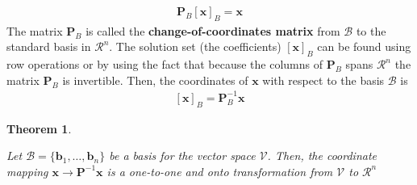 \documentclass[
]{book}
\newtheorem{theorem}{Theorem}[chapter]
\theoremstyle{definition}
\theoremstyle{definition}
\theoremstyle{definition}
\theoremstyle{remark}
\begin{document}
\[
\begin{aligned}
\mathbf{P}_B [\mathbf{x}]_B = \mathbf{x}
\end{aligned}
\]
The matrix \(\mathbf{P}_B\) is called the \textbf{change-of-coordinates matrix} from \(\mathcal{B}\) to the standard basis in \(\mathcal{R}^n\). The solution set (the coefficients) \([\mathbf{x}]_B\) can be found using row operations or by using the fact that because the columns of \(\mathbf{P}_B\) spans \(\mathcal{R}^n\) the matrix \(\mathbf{P}_B\) is invertible. Then, the coordinates of \(\mathbf{x}\) with respect to the basis \(\mathcal{B}\) is
\[
\begin{aligned}
[\mathbf{x}]_B = \mathbf{P}_B^{-1} \mathbf{x}
\end{aligned}
\]

\begin{theorem}
\protect\hypertarget{thm:unlabeled-div-139}{}\label{thm:unlabeled-div-139}

Let \(\mathcal{B} = \{ \mathbf{b}_1, \ldots, \mathbf{b}_n\}\) be a basis for the vector space \(\mathcal{V}\). Then, the coordinate mapping \(\mathbf{x} \rightarrow \mathbf{P}^{-1} \mathbf{x}\) is a one-to-one and onto transformation from \(\mathcal{V}\) to \(\mathcal{R}^n\)

\end{theorem}
\end{document}
